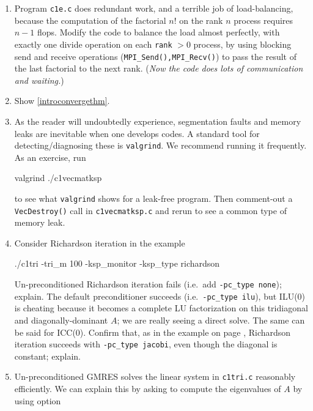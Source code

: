 \renewcommand{\labelenumi}{\arabic{chapter}.\arabic{enumi}\quad}
\begin{enumerate}
\item Program \texttt{c1e.c} does redundant work, and a terrible job of load-balancing, because the computation of the factorial $n!$ on the rank $n$ process requires $n-1$ flops.  Modify the code to balance the load almost perfectly, with exactly one divide operation on each \texttt{rank} $>0$ process, by using blocking send and receive operations (\texttt{MPI\_Send(),MPI\_Recv()}) to pass the result of the last factorial to the next rank.  (\emph{Now the code does lots of communication and waiting.})
\item Show \eqref{introconvergethm}.
\item As the reader will undoubtedly experience, segmentation faults and memory leaks are inevitable when one develops \PETSc codes.  A standard tool for detecting/diagnosing these is \texttt{valgrind}.  We recommend running it frequently.  As an exercise, run
\begin{cline}
valgrind ./c1vecmatksp
\end{cline}
to see what \texttt{valgrind} shows for a leak-free program.  Then comment-out a \texttt{VecDestroy()} call in \texttt{c1vecmatksp.c} and rerun to see a common type of memory leak.
\item Consider Richardson iteration in the example
\begin{cline}
./c1tri -tri_m 100 -ksp_monitor -ksp_type richardson
\end{cline}
Un-preconditioned Richardson iteration fails (i.e.~add \texttt{-pc\_type none}); explain.  The default preconditioner succeeds (i.e.~\texttt{-pc\_type ilu}), but ILU($0$) is cheating because it becomes a complete LU factorization on this tridiagonal and diagonally-dominant $A$; we are really seeing a direct solve.  The same can be said for ICC($0$).  Confirm that, as in the example on page \pageref{introprerichardson}, Richardson iteration succeeds with \texttt{-pc\_type jacobi}, even though the diagonal is constant; explain.
\item \label{exer:computeeigs} Un-preconditioned GMRES solves the linear system in \texttt{c1tri.c} reasonably efficiently.  We can explain this by asking \PETSc to compute the eigenvalues of $A$ by using option

\end{enumerate}

